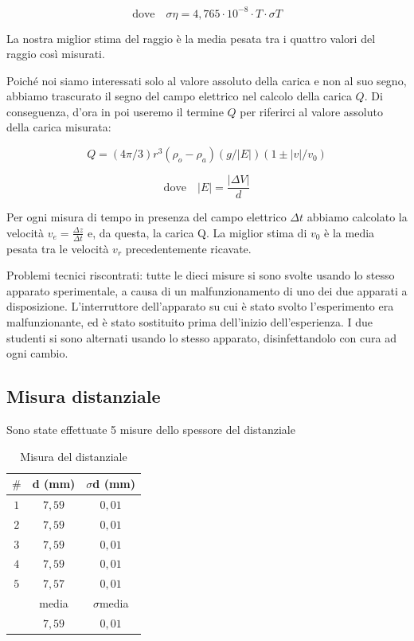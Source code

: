 \documentclass{article}
\begin{document}
\[\textrm{dove} \quad \sigma \eta = 4,765 \cdot 10^{-8} \cdot T \cdot \sigma T\]

La nostra miglior stima del raggio è la media pesata tra i quattro valori del raggio così misurati.

\vspace{4mm}

Poiché noi siamo interessati solo al valore assoluto della carica e non al suo segno, abbiamo trascurato il segno del campo elettrico nel calcolo della carica $Q$. Di conseguenza, d'ora in poi useremo il termine $Q$ per riferirci al valore assoluto della carica misurata:

\[Q=(4 \pi /3)r^3(\rho _o - \rho _a)(g/|E|)(1 \pm |v|/v_0)\]

\[ \textrm{dove} \quad |E|=\frac{|\Delta V|}{d}\]

Per ogni misura di tempo in presenza del campo elettrico $\Delta t$ abbiamo calcolato la velocità $v_e = \frac{\Delta z}{\Delta t}$ e, da questa, la carica Q. La miglior stima di $v_0$ è la media pesata tra le velocità $v_r$ precedentemente ricavate.

\vspace{3mm}

Problemi tecnici riscontrati: tutte le dieci misure si sono svolte usando lo stesso apparato sperimentale, a causa di un malfunzionamento di uno dei due apparati a disposizione. L’interruttore dell’apparato su cui è stato svolto l’esperimento era malfunzionante, ed è stato sostituito prima dell’inizio dell’esperienza. I due studenti si sono alternati usando lo stesso apparato, disinfettandolo con cura ad ogni cambio.

\pagebreak

\subsection{Misura distanziale}

Sono state effettuate 5 misure dello spessore del distanziale

\begin{table}[h!]
\centering
\begin{tabular}{ | c | c | c | }
  \hline
  $\#$ & d (mm) & $\sigma$d (mm) \\
  \hline
  $1$ & $7,59$ & $0,01$ \\
  $2$ & $7,59$ & $0,01$ \\
  $3$ & $7,59$ & $0,01$ \\
  $4$ & $7,59$ & $0,01$ \\
  $5$ & $7,57$ & $0,01$ \\
  \hline
  & media & $\sigma$media \\
  \hline
  & $7,59$ & $0,01$ \\
  \hline
\end{tabular}
  \caption{Misura del distanziale}
  \label{dist_1}
\end{table}
\end{document}
